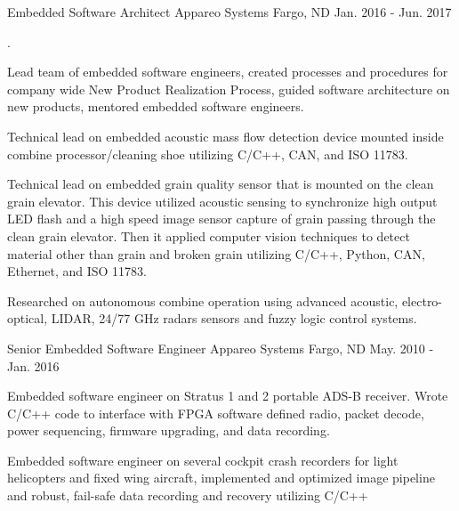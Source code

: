 \begin{cventries}
  \cventry
    {Embedded Software Architect} %
    {Appareo Systems} %
    {Fargo, ND} %
    {Jan. 2016 - Jun. 2017} %
    {.
      \begin{cvitems} %
        \item {Lead team of embedded software engineers, created processes and procedures for company wide New Product Realization Process, guided software architecture on new products, mentored embedded software engineers.}
        \item {Technical lead on embedded acoustic mass flow detection device mounted inside combine processor/cleaning shoe utilizing C/C++, CAN, and ISO 11783.}
        \item {Technical lead on embedded grain quality sensor that is mounted on the clean grain elevator. This device utilized acoustic sensing to synchronize high output LED flash and a high speed image sensor capture of grain passing through the clean grain elevator. Then it applied computer vision techniques to detect material other than grain and broken grain utilizing C/C++, Python, CAN, Ethernet, and ISO 11783.}
        \item {Researched on autonomous combine operation using advanced acoustic, electro-optical, LIDAR, 24/77 GHz radars sensors and fuzzy logic control systems.}
      \end{cvitems}
    }

  \cventry
    {Senior Embedded Software Engineer} %
    {Appareo Systems} %
    {Fargo, ND} %
    {May. 2010 - Jan. 2016} %
    {
      \begin{cvitems} %
        \item {Embedded software engineer on Stratus 1 and 2 portable ADS-B receiver. Wrote C/C++ code to interface with FPGA software defined radio, packet decode, power sequencing, firmware upgrading, and data recording.}
        \item {Embedded software engineer on several cockpit crash recorders for light helicopters and fixed wing aircraft, implemented and optimized image pipeline and robust, fail-safe data recording and recovery utilizing C/C++}
      \end{cvitems}
    }


\end{cventries}
